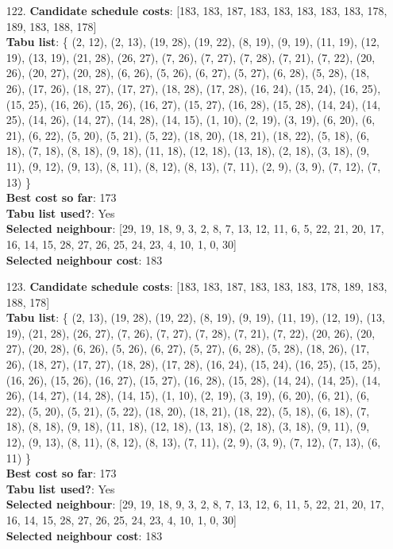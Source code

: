 \documentclass[fleqn]{article}
\begin{document}
\begin{itemize}
    \item[122.] \textbf{Candidate schedule costs}: [183, 183, 187, 183, 183, 183, 183, 183, 178, 189, 183, 188, 178] \\
    \textbf{Tabu list}: \{ (2, 12), (2, 13), (19, 28), (19, 22), (8, 19), (9, 19), (11, 19), (12, 19), (13, 19), (21, 28), (26, 27), (7, 26), (7, 27), (7, 28), (7, 21), (7, 22), (20, 26), (20, 27), (20, 28), (6, 26), (5, 26), (6, 27), (5, 27), (6, 28), (5, 28), (18, 26), (17, 26), (18, 27), (17, 27), (18, 28), (17, 28), (16, 24), (15, 24), (16, 25), (15, 25), (16, 26), (15, 26), (16, 27), (15, 27), (16, 28), (15, 28), (14, 24), (14, 25), (14, 26), (14, 27), (14, 28), (14, 15), (1, 10), (2, 19), (3, 19), (6, 20), (6, 21), (6, 22), (5, 20), (5, 21), (5, 22), (18, 20), (18, 21), (18, 22), (5, 18), (6, 18), (7, 18), (8, 18), (9, 18), (11, 18), (12, 18), (13, 18), (2, 18), (3, 18), (9, 11), (9, 12), (9, 13), (8, 11), (8, 12), (8, 13), (7, 11), (2, 9), (3, 9), (7, 12), (7, 13) \} \\
    \textbf{Best cost so far}: 173 \\
    \textbf{Tabu list used?}: Yes \\
    \textbf{Selected neighbour}: [29, 19, 18, 9, 3, 2, 8, 7, 13, 12, 11, 6, 5, 22, 21, 20, 17, 16, 14, 15, 28, 27, 26, 25, 24, 23, 4, 10, 1, 0, 30] \\
    \textbf{Selected neighbour cost}: 183
      

    \item[123.] \textbf{Candidate schedule costs}: [183, 183, 187, 183, 183, 183, 178, 189, 183, 188, 178] \\
    \textbf{Tabu list}: \{ (2, 13), (19, 28), (19, 22), (8, 19), (9, 19), (11, 19), (12, 19), (13, 19), (21, 28), (26, 27), (7, 26), (7, 27), (7, 28), (7, 21), (7, 22), (20, 26), (20, 27), (20, 28), (6, 26), (5, 26), (6, 27), (5, 27), (6, 28), (5, 28), (18, 26), (17, 26), (18, 27), (17, 27), (18, 28), (17, 28), (16, 24), (15, 24), (16, 25), (15, 25), (16, 26), (15, 26), (16, 27), (15, 27), (16, 28), (15, 28), (14, 24), (14, 25), (14, 26), (14, 27), (14, 28), (14, 15), (1, 10), (2, 19), (3, 19), (6, 20), (6, 21), (6, 22), (5, 20), (5, 21), (5, 22), (18, 20), (18, 21), (18, 22), (5, 18), (6, 18), (7, 18), (8, 18), (9, 18), (11, 18), (12, 18), (13, 18), (2, 18), (3, 18), (9, 11), (9, 12), (9, 13), (8, 11), (8, 12), (8, 13), (7, 11), (2, 9), (3, 9), (7, 12), (7, 13), (6, 11) \} \\
    \textbf{Best cost so far}: 173 \\
    \textbf{Tabu list used?}: Yes \\
    \textbf{Selected neighbour}: [29, 19, 18, 9, 3, 2, 8, 7, 13, 12, 6, 11, 5, 22, 21, 20, 17, 16, 14, 15, 28, 27, 26, 25, 24, 23, 4, 10, 1, 0, 30] \\
    \textbf{Selected neighbour cost}: 183
      


\end{itemize}
\end{document}
